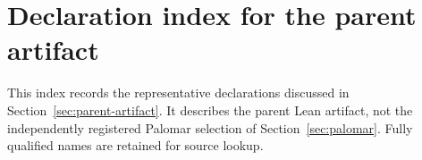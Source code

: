 \documentclass[10pt,reqno]{amsart}
\theoremstyle{definition}
\theoremstyle{plain}
\theoremstyle{remark}
\begin{document}
\section{Declaration index for the parent artifact}\label{app:declarations}
This index records the representative declarations discussed in Section~\ref{sec:parent-artifact}.
It describes the parent Lean artifact, not the independently registered
Palomar selection of Section~\ref{sec:palomar}.  Fully qualified names are retained for
source lookup.


\begingroup\small\endgroup
\end{document}
